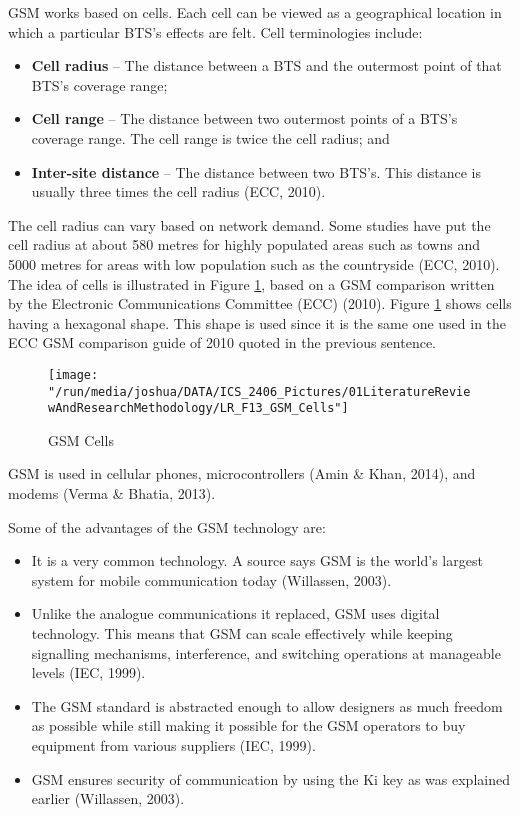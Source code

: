 \documentclass[12pt,svgnames,smaller]{article} %
\begin{document}
	GSM works based on cells. Each cell can be viewed as a geographical location in which a particular BTS’s effects are felt.  Cell terminologies include:
	
	\begin{itemize}
		\item \textbf{Cell radius} – The distance between a BTS and the outermost point of that BTS’s coverage range; 
		\item \textbf{Cell range} – The distance between two outermost points of a BTS’s coverage range. The cell range is twice the cell radius; and
		\item \textbf{Inter-site distance} – The distance between two BTS’s. This distance is usually three times the cell radius (ECC, 2010).
	\end{itemize}
	
	The cell radius can vary based on network demand. Some studies have put the cell radius at about 580 metres for highly populated areas such as towns and 5000 metres for areas with low population such as the countryside (ECC, 2010). The idea of cells is illustrated in Figure \ref{fig:LiteratureReview-Figure13}, based on a GSM comparison written by the Electronic Communications Committee (ECC) (2010). Figure \ref{fig:LiteratureReview-Figure13} shows cells having a hexagonal shape. This shape is used since it is the same one used in the ECC GSM comparison guide of 2010 quoted in the previous sentence.
	
	
	\begin{figure}
		\centering
		\texttt{[image: "/run/media/joshua/DATA/ICS\_2406\_Pictures/01LiteratureReviewAndResearchMethodology/LR\_F13\_GSM\_Cells"]}
		\caption{GSM Cells}
		\label{fig:LiteratureReview-Figure13}
	\end{figure}
	
	GSM is used in cellular phones, microcontrollers (Amin \& Khan, 2014), and modems (Verma \& Bhatia, 2013).
	
	Some of the advantages of the GSM technology are:
	
	\begin{itemize}
		\item It is a very common technology. A source says GSM is the world’s largest system for mobile communication today (Willassen, 2003).
		\item Unlike the analogue communications it replaced, GSM uses digital technology. This means that GSM can scale effectively while keeping signalling mechanisms, interference, and switching operations at manageable levels (IEC, 1999).
		\item The GSM standard is abstracted enough to allow designers as much freedom as possible while still making it possible for the GSM operators to buy equipment from various suppliers (IEC, 1999).
		\item GSM ensures security of communication by using the Ki key as was explained earlier (Willassen, 2003).
	\end{itemize}
	
\end{document}

